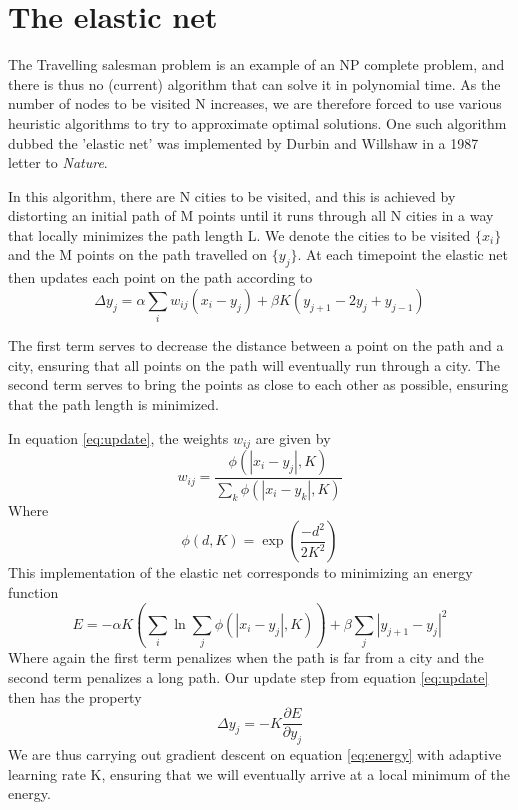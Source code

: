 \documentclass{article}
\begin{document}
\section{The elastic net}

The Travelling salesman problem is an example of an NP complete problem, and there is thus no (current) algorithm that can solve it in polynomial time. As the number of nodes to be visited N increases, we are therefore forced to use various heuristic algorithms to try to approximate optimal solutions. One such algorithm dubbed the 'elastic net' was implemented by Durbin and Willshaw in a 1987 letter to \textit{Nature}.

In this algorithm, there are N cities to be visited, and this is achieved by distorting an initial path of M points until it runs through all N cities in a way that locally minimizes the path length L.
We denote the cities to be visited $\{x_i\}$ and the M points on the path travelled on $\{y_j\}$. At each timepoint the elastic net then updates each point on the path according to
\begin{equation}\label{eq:update}
\Delta y_j =\alpha \sum_i{w_{ij}(x_i-y_j) + \beta K (y_{j+1} - 2y_j + y_{j-1})} 
\end{equation}

The first term serves to decrease the distance between a point on the path and a city, ensuring that all points on the path will eventually run through a city. The second term serves to bring the points as close to each other as possible, ensuring that the path length is minimized.

In equation \ref{eq:update}, the weights $w_{ij}$ are given by
\begin{equation}
w_{ij} = \dfrac{\phi(|x_i-y_j|, K)}{\sum_k{\phi(|x_i-y_k|, K)}}
\end{equation}
Where
\begin{equation}
\phi (d, K) = \exp{(\dfrac{-d^2}{2K^2})}
\end{equation}
This implementation of the elastic net corresponds to minimizing an energy function
\begin{equation}\label{eq:energy}
E = -\alpha K (\sum_i{\ln{\sum_j{\phi(|x_i-y_j|, K)}}})+\beta \sum_j{|y_{j+1}-y_j|^2}
\end{equation}
Where again the first term penalizes when the path is far from a city and the second term penalizes a long path.
Our update step from equation \ref{eq:update} then has the property
\begin{equation}
\Delta y_j = -K \dfrac{\partial E}{\partial y_j}
\end{equation}
We are thus carrying out gradient descent on equation \ref{eq:energy} with adaptive learning rate K, ensuring that we will eventually arrive at a local minimum of the energy.
\end{document}
